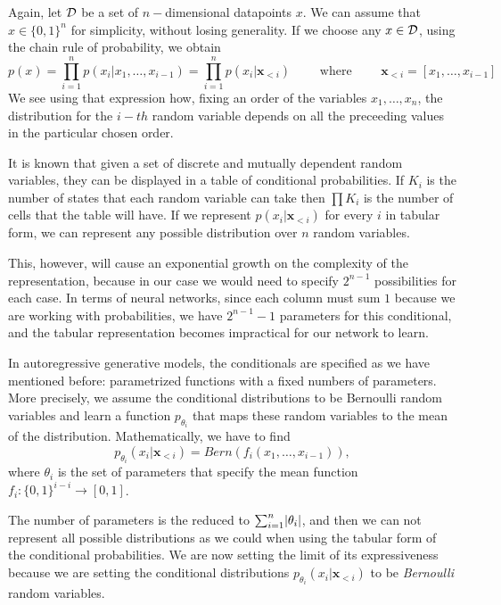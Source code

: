 Again, let $\mathcal{D}$ be a set of $n-$dimensional datapoints $x$. We can assume that $x \in \{0,1\}^n$ for simplicity, without losing generality. If we choose any $x\in \mathcal{D}$, using the chain rule of probability, we obtain
$$
p(x) = \prod_{i=1} ^n p(x_i | x_1,\dots,x_{i-1}) = \prod_{i = 1}^n p(x_i|\bm{x}_{<i}) \quad \quad \text{ where } \quad \quad \bm{x}_{<i} = [x_1,\dots, x_{i-1}]
$$
We see using that expression how, fixing an order of the variables $x_1,\dots,x_n$, the distribution for the $i-th$ random variable depends on all the preceeding values in the particular chosen order. 

It is known that given a set of discrete and mutually dependent random variables, they can be displayed in a table of conditional probabilities. If $K_i$ is the number of states that each random variable can take
then $\prod K_i$ is the number of cells that the table will have. If we represent $p(x_i|\bm{x}_{<i})$ for every $i$ in tabular form, we can represent
any possible distribution over $n$ random variables. 

This, however, will cause an exponential growth on the complexity of the representation, because in our case we would need to specify $2^{n-1}$ possibilities 
for each case. In terms of neural networks, since each column must sum $1$ because we are working with probabilities, we have $2^{n-1}-1$ parameters for this conditional, and the tabular representation
becomes impractical for our network to learn.

In autoregressive generative models, the conditionals are specified as we have mentioned before: parametrized functions with a fixed numbers of parameters. More precisely,  we assume 
the conditional distributions to be Bernoulli random variables and learn a function $p_{\theta_i}$ that maps these random variables to the mean of the distribution. Mathematically, we have to find 
$$
p_{\theta_i}(x_i | \bm{x}_{<i}) = Bern(f_i(x_1,\dots,x_{i-1})),
$$
where $\theta_i$ is the set of parameters that specify the mean function $f_i:\{0,1\}^{i-i} \to [0,1]$.

The number of parameters is the reduced to $\sum_{i=1}^n \lvert\theta_i\rvert$, and then we can not represent all possible distributions as we could when using the tabular form of the conditional probabilities.
We are now setting the limit of its expressiveness because we are setting the conditional distributions $p_{\theta_i}(x_i|\bm{x}_{<i})$ to be \emph{Bernoulli} random variables. 

